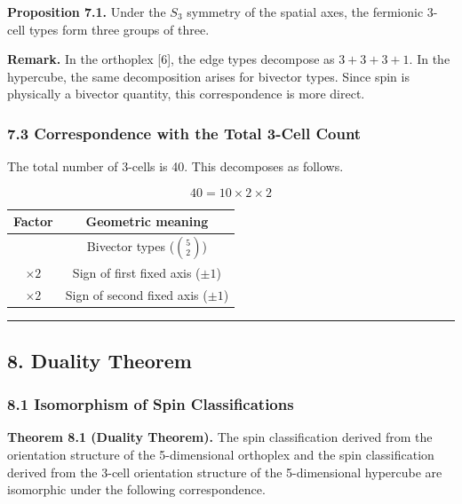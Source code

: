 \documentclass[a4paper,11pt]{article}
\newcounter{none}
\begin{document}
\textbf{Proposition 7.1.} Under the $S_3$ symmetry of the spatial axes, the fermionic 3-cell types form three groups of three.

\textbf{Remark.} In the orthoplex [6], the edge types decompose as $3 + 3 + 3 + 1$. In the hypercube, the same decomposition arises for bivector types. Since spin is physically a bivector quantity, this correspondence is more direct.

\subsubsection*{7.3 Correspondence with the Total 3-Cell Count}

The total number of 3-cells is 40. This decomposes as follows.

\[40 = 10 \times 2 \times 2\]

{\def\LTcaptype{none}
\begin{longtable}[]{@{}cc@{}}
\toprule
Factor & Geometric meaning \\
\midrule
\endhead
\bottomrule
\endlastfoot
10 & Bivector types ($\binom{5}{2}$) \\
$\times 2$ & Sign of first fixed axis ($\pm 1$) \\
$\times 2$ & Sign of second fixed axis ($\pm 1$) \\
\end{longtable}
}

\begin{center}\rule{0.5\linewidth}{0.5pt}\end{center}

\subsection*{8. Duality Theorem}

\subsubsection*{8.1 Isomorphism of Spin Classifications}

\textbf{Theorem 8.1 (Duality Theorem).} The spin classification derived from the orientation structure of the 5-dimensional orthoplex and the spin classification derived from the 3-cell orientation structure of the 5-dimensional hypercube are isomorphic under the following correspondence.
\end{document}
